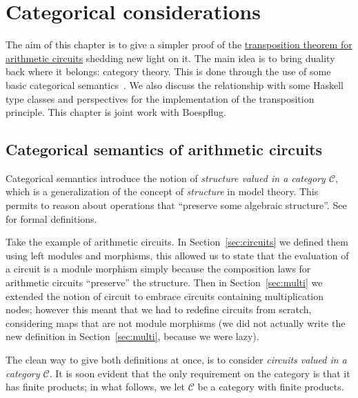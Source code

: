 \chapter{Categorical considerations}
\label{cha:basic-categ-theory}

\renewcommand{\C}{\mathcal{C}}
\newcommand{\D}{\mathcal{D}}

The aim of this chapter is to give a simpler proof of the
\hyperref[th:tellegen]{transposition theorem for arithmetic circuits}
shedding new light on it. The main idea is to bring duality back where
it belongs: category theory. This is done through the use of some
basic categorical semantics~\cite{pitts01,asperti+longo}. We also
discuss the relationship with some Haskell type classes and
perspectives for the implementation of the transposition
principle. This chapter is joint work with Boespflug.



\section{Categorical semantics of arithmetic circuits}
\label{sec:categ-semant-arithm}
Categorical semantics introduce the
notion of \emph{structure valued
  in a category $\C$}, which is a generalization of the concept of
\emph{structure} in model theory. This permits to
reason about operations that ``preserve some algebraic structure''.
See~\cite{pitts01} for formal definitions.

Take the example of arithmetic circuits. In
Section~\ref{sec:circuits} we defined them using left modules and
morphisms, this allowed us to state that the evaluation of a circuit
is a module morphism simply because the composition laws for
arithmetic circuits ``preserve'' the structure. Then in
Section~\ref{sec:multi} we extended the notion of circuit to embrace
circuits containing multiplication nodes; however this meant that we
had to redefine circuits from scratch, considering maps that are not
module morphisms (we did not actually write the new definition in
Section~\ref{sec:multi}, because we were lazy).

The clean way to give both definitions at once, is to consider
\emph{circuits valued
  in a category $\C$}.  It is soon evident that the only requirement
on the category is that it has finite products; in what follows, we
let $\C$ be a category with finite products.
  
